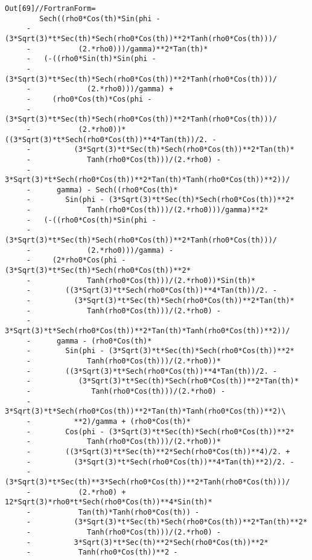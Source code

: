 \begin{verbatim}
Out[69]//FortranForm=
        Sech((rho0*Cos(th)*Sin(phi - 
     -          (3*Sqrt(3)*t*Sec(th)*Sech(rho0*Cos(th))**2*Tanh(rho0*Cos(th)))/
     -           (2.*rho0)))/gamma)**2*Tan(th)*
     -   (-((rho0*Sin(th)*Sin(phi - 
     -            (3*Sqrt(3)*t*Sec(th)*Sech(rho0*Cos(th))**2*Tanh(rho0*Cos(th)))/
     -             (2.*rho0)))/gamma) + 
     -     (rho0*Cos(th)*Cos(phi - 
     -          (3*Sqrt(3)*t*Sec(th)*Sech(rho0*Cos(th))**2*Tanh(rho0*Cos(th)))/
     -           (2.*rho0))*((3*Sqrt(3)*t*Sech(rho0*Cos(th))**4*Tan(th))/2. - 
     -          (3*Sqrt(3)*t*Sec(th)*Sech(rho0*Cos(th))**2*Tan(th)*
     -             Tanh(rho0*Cos(th)))/(2.*rho0) - 
     -          3*Sqrt(3)*t*Sech(rho0*Cos(th))**2*Tan(th)*Tanh(rho0*Cos(th))**2))/
     -      gamma) - Sech((rho0*Cos(th)*
     -        Sin(phi - (3*Sqrt(3)*t*Sec(th)*Sech(rho0*Cos(th))**2*
     -             Tanh(rho0*Cos(th)))/(2.*rho0)))/gamma)**2*
     -   (-((rho0*Cos(th)*Sin(phi - 
     -            (3*Sqrt(3)*t*Sec(th)*Sech(rho0*Cos(th))**2*Tanh(rho0*Cos(th)))/
     -             (2.*rho0)))/gamma) - 
     -     (2*rho0*Cos(phi - (3*Sqrt(3)*t*Sec(th)*Sech(rho0*Cos(th))**2*
     -             Tanh(rho0*Cos(th)))/(2.*rho0))*Sin(th)*
     -        ((3*Sqrt(3)*t*Sech(rho0*Cos(th))**4*Tan(th))/2. - 
     -          (3*Sqrt(3)*t*Sec(th)*Sech(rho0*Cos(th))**2*Tan(th)*
     -             Tanh(rho0*Cos(th)))/(2.*rho0) - 
     -          3*Sqrt(3)*t*Sech(rho0*Cos(th))**2*Tan(th)*Tanh(rho0*Cos(th))**2))/
     -      gamma - (rho0*Cos(th)*
     -        Sin(phi - (3*Sqrt(3)*t*Sec(th)*Sech(rho0*Cos(th))**2*
     -             Tanh(rho0*Cos(th)))/(2.*rho0))*
     -        ((3*Sqrt(3)*t*Sech(rho0*Cos(th))**4*Tan(th))/2. - 
     -           (3*Sqrt(3)*t*Sec(th)*Sech(rho0*Cos(th))**2*Tan(th)*
     -              Tanh(rho0*Cos(th)))/(2.*rho0) - 
     -           3*Sqrt(3)*t*Sech(rho0*Cos(th))**2*Tan(th)*Tanh(rho0*Cos(th))**2)\
     -          **2)/gamma + (rho0*Cos(th)*
     -        Cos(phi - (3*Sqrt(3)*t*Sec(th)*Sech(rho0*Cos(th))**2*
     -             Tanh(rho0*Cos(th)))/(2.*rho0))*
     -        ((3*Sqrt(3)*t*Sec(th)**2*Sech(rho0*Cos(th))**4)/2. + 
     -          (3*Sqrt(3)*t*Sech(rho0*Cos(th))**4*Tan(th)**2)/2. - 
     -          (3*Sqrt(3)*t*Sec(th)**3*Sech(rho0*Cos(th))**2*Tanh(rho0*Cos(th)))/
     -           (2.*rho0) + 12*Sqrt(3)*rho0*t*Sech(rho0*Cos(th))**4*Sin(th)*
     -           Tan(th)*Tanh(rho0*Cos(th)) - 
     -          (3*Sqrt(3)*t*Sec(th)*Sech(rho0*Cos(th))**2*Tan(th)**2*
     -             Tanh(rho0*Cos(th)))/(2.*rho0) - 
     -          3*Sqrt(3)*t*Sec(th)**2*Sech(rho0*Cos(th))**2*
     -           Tanh(rho0*Cos(th))**2 - 

\end{verbatim}

